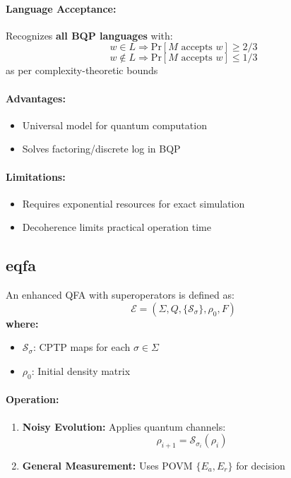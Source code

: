 \paragraph{Language Acceptance:}
Recognizes \textbf{all BQP languages} with:
\[
w \in L \Rightarrow \text{Pr}[M \text{ accepts } w] \geq 2/3
\]
\[
w \notin L \Rightarrow \text{Pr}[M \text{ accepts } w] \leq 1/3
\]
as per complexity-theoretic bounds \cite{nielsen2010quantum}

\paragraph{Advantages:}
\begin{itemize}
    \item Universal model for quantum computation
    \item Solves factoring/discrete log in BQP
\end{itemize}

\paragraph{Limitations:}
\begin{itemize}
    \item Requires exponential resources for exact simulation
    \item Decoherence limits practical operation time
\end{itemize}

\subsection{\acrfull{eqfa}}
\label{subsec:eqfa}

\begin{definition}
An enhanced QFA with superoperators is defined as:
\[
\mathcal{E} = (\Sigma, Q, \{\mathcal{S}_\sigma\}, \rho_0, F)
\]
\textbf{where:}
\begin{itemize}
    \item $\mathcal{S}_\sigma$: CPTP maps for each $\sigma \in \Sigma$
    \item $\rho_0$: Initial density matrix
\end{itemize}
\end{definition}

\paragraph{Operation:}
\begin{enumerate}
    \item \textbf{Noisy Evolution:} Applies quantum channels:
    \[
    \rho_{i+1} = \mathcal{S}_{\sigma_i}(\rho_i)
    \]
    \item \textbf{General Measurement:} Uses POVM $\{E_a, E_r\}$ for decision
\end{enumerate}

